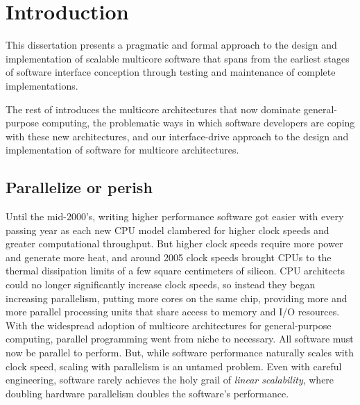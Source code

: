\section{Introduction}
\label{sec:intro}


This dissertation presents a pragmatic and formal approach to the
design and implementation of scalable multicore software that spans
from the earliest stages of software interface conception through
testing and maintenance of complete implementations.

The rest of  introduces the multicore
architectures that now dominate general-purpose computing, the
problematic ways in which software developers are coping with these
new architectures, and our interface-drive approach to the design and
implementation of software for multicore architectures.


\subsection{Parallelize or perish}

Until the mid-2000's, writing higher performance software got easier
with every passing year as each new CPU model clambered for higher
clock speeds and greater computational throughput.
%
But higher clock speeds require more power and generate more heat, and
around 2005 clock speeds brought CPUs to the thermal dissipation
limits of a few square centimeters of silicon.
%
CPU architects could no longer significantly increase clock speeds, so
instead they began increasing parallelism, putting more cores on the
same chip, providing more and more parallel processing units that
share access to memory and I/O resources.
%
With the widespread adoption of multicore architectures for
general-purpose computing, parallel programming went from niche to
necessary.
%
All software must now be parallel to perform.
%
But, while software performance naturally scales with clock speed,
scaling with parallelism is an untamed problem.  Even with careful
engineering, software rarely achieves the holy grail of \emph{linear
  scalability}, where doubling hardware parallelism doubles the
software's performance.

